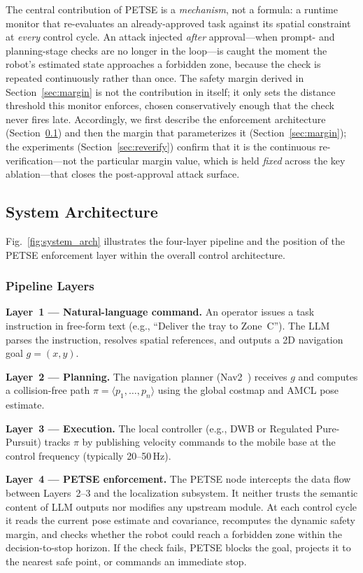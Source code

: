 \documentclass[journal,twoside,web]{ieeecolor}
\begin{document}
The central contribution of PETSE is a \emph{mechanism}, not a formula: a runtime monitor that re-evaluates an already-approved task against its spatial constraint at \emph{every} control cycle. An attack injected \emph{after} approval---when prompt- and planning-stage checks are no longer in the loop---is caught the moment the robot's estimated state approaches a forbidden zone, because the check is repeated continuously rather than once. The safety margin derived in Section~\ref{sec:margin} is not the contribution in itself; it only sets the distance threshold this monitor enforces, chosen conservatively enough that the check never fires late. Accordingly, we first describe the enforcement architecture (Section~\ref{sec:architecture}) and then the margin that parameterizes it (Section~\ref{sec:margin}); the experiments (Section~\ref{sec:reverify}) confirm that it is the continuous re-verification---not the particular margin value, which is held \emph{fixed} across the key ablation---that closes the post-approval attack surface.

\subsection{System Architecture}\label{sec:architecture}
Fig.~\ref{fig:system_arch} illustrates the four-layer pipeline and the position of the PETSE enforcement layer within the overall control architecture.

\subsubsection{Pipeline Layers}
\textbf{Layer~1 --- Natural-language command.}
An operator issues a task instruction in free-form text (e.g., ``Deliver the tray to Zone~C''). The LLM parses the instruction, resolves spatial references, and outputs a 2D navigation goal $g=(x,y)$.

\textbf{Layer~2 --- Planning.}
The navigation planner (Nav2~\cite{macenski2020marathon}) receives $g$ and computes a collision-free path $\pi = \langle p_1,\dots,p_n \rangle$ using the global costmap and AMCL pose estimate.

\textbf{Layer~3 --- Execution.}
The local controller (e.g., DWB or Regulated Pure-Pursuit) tracks $\pi$ by publishing velocity commands to the mobile base at the control frequency (typically 20--50\,Hz).

\textbf{Layer~4 --- PETSE enforcement.}
The PETSE node intercepts the data flow between Layers~2--3 and the localization subsystem. It neither trusts the semantic content of LLM outputs nor modifies any upstream module. At each control cycle it reads the current pose estimate and covariance, recomputes the dynamic safety margin, and checks whether the robot could reach a forbidden zone within the decision-to-stop horizon. If the check fails, PETSE blocks the goal, projects it to the nearest safe point, or commands an immediate stop.
\end{document}
